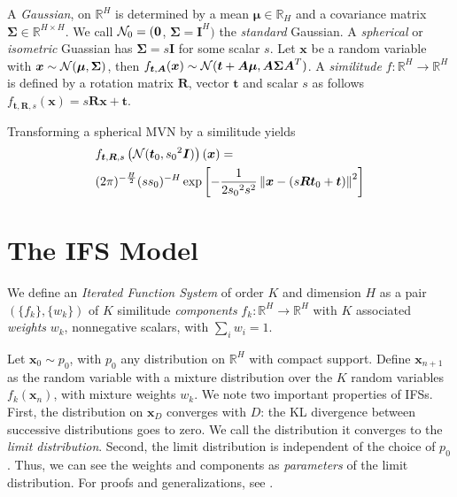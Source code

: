 \documentclass[reprint,amsmath,amssymb,aps,prl]{revtex4-1}
\newcommand{\R}{\mathbb{R}}
\newcommand{\cN}{{\cal N}}
\newcommand{\bx}{\boldsymbol x}
\newcommand{\bt}{\boldsymbol t}
\newcommand{\bA}{\boldsymbol A}
\newcommand{\bmu}{\boldsymbol \mu}
\newcommand{\bSig}{\boldsymbol \Sigma}
\newcommand{\bI}{\boldsymbol I}
\newcommand{\bR}{\boldsymbol R}
\begin{document}
A \emph{Gaussian}, on $\R^H$ is determined by a mean $\bmu \in \R_H$ and a covariance matrix $\bSig \in \R^{H\times H}$. We call $\cN_0 = (\boldsymbol 0$, $\bSig = \bI^H)$ the \emph{standard} Gaussian. A \emph{spherical} or \emph{isometric} Guassian has $\bSig = s\bI$ for some scalar $s$. Let $\bx$ be a random variable with $\bx \sim \cN(\bmu, \bSig)$, then $f_{\bt, \bA}(\bx) \sim \cN(\bt + \bA\bmu, \bA\bSig \bA^T)$.
A \emph{similitude} $f:\R^H \to \R^H$ is defined by a rotation matrix $\bR$, vector $\bt$ and scalar $s$ as follows $f_{\bt, \bR, s}(\bx) = s\bR \bx + \bt$.

Transforming a spherical MVN by a similitude yields
\begin{align}
&f_{\bt, \bR, s}\left(\cN(\bt_0, {s_0}^2 \bI)\right)(\bx) = \notag \\
&(2\pi)^{-\frac{H}{2}} ({ss_0})^{-H} \exp \left[- \frac{1}{2{s_0}^2s^2}\left\| \bx - (s \bR \bt_0 + \bt)\right \|^2\right] \label{line:inverse}
\end{align}

\section{The IFS Model} 

We define an \emph{Iterated Function System} of order $K$ and dimension $H$ as a pair $(\{f_k\}, \{w_k\})$ of $K$ similitude \emph{components} $f_k: \R^H \to \R^H$ with $K$ associated \emph{weights} $w_k$, nonnegative scalars, with $\sum_i w_i = 1$.  

Let $\bx_0 \sim p_0$, with $p_0$ any distribution on $\R^H$ with compact support. Define $\bx_{n+1}$ as the random variable with a mixture distribution over the $K$ random variables $f_k(\bx_n)$, with mixture weights $w_k$. We note two important properties of IFSs. First, the distribution on $\bx_D$ converges with $D$: the KL divergence between successive distributions goes to zero. We call the distribution it converges to the \emph{limit distribution}. Second, the limit distribution is independent of the choice of $p_0$. Thus, we can see the weights and components as \emph{parameters} of the limit distribution. For proofs and generalizations, see \cite{hutchinson2000deterministic}.
\end{document}
